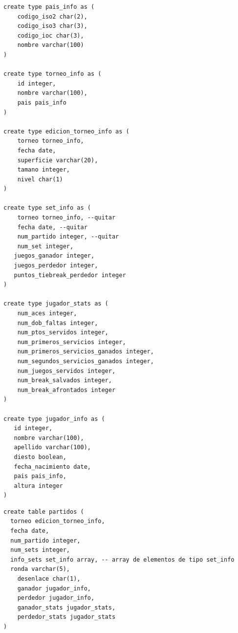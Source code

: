 \documentclass[11pt]{opticajnl}
\begin{document}
\begin{verbatim}
create type pais_info as (
	codigo_iso2 char(2),
	codigo_iso3 char(3),
	codigo_ioc char(3),
	nombre varchar(100)
)

create type torneo_info as (
	id integer,
	nombre varchar(100),
	pais pais_info
)

create type edicion_torneo_info as (
	torneo torneo_info,
	fecha date,
	superficie varchar(20),
	tamano integer,
	nivel char(1)
)

create type set_info as (
	torneo torneo_info, --quitar
	fecha date, --quitar
	num_partido integer, --quitar
    num_set integer,
   juegos_ganador integer,
   juegos_perdedor integer,
   puntos_tiebreak_perdedor integer
)

create type jugador_stats as (
	num_aces integer,
	num_dob_faltas integer,
	num_ptos_servidos integer,
	num_primeros_servicios integer,
	num_primeros_servicios_ganados integer,
	num_segundos_servicios_ganados integer,
	num_juegos_servidos integer,
	num_break_salvados integer,
	num_break_afrontados integer
)

create type jugador_info as (
   id integer,
   nombre varchar(100),
   apellido varchar(100),
   diesto boolean,
   fecha_nacimiento date,
   pais pais_info,
   altura integer
)
\end{verbatim}

\begin{verbatim}
create table partidos (
  torneo edicion_torneo_info,
  fecha date,
  num_partido integer,
  num_sets integer,
  info_sets set_info array, -- array de elementos de tipo set_info
  ronda varchar(5), 
	desenlace char(1), 
	ganador jugador_info,
	perdedor jugador_info,
	ganador_stats jugador_stats,
	perdedor_stats jugador_stats
)
\end{verbatim}
\end{document}

